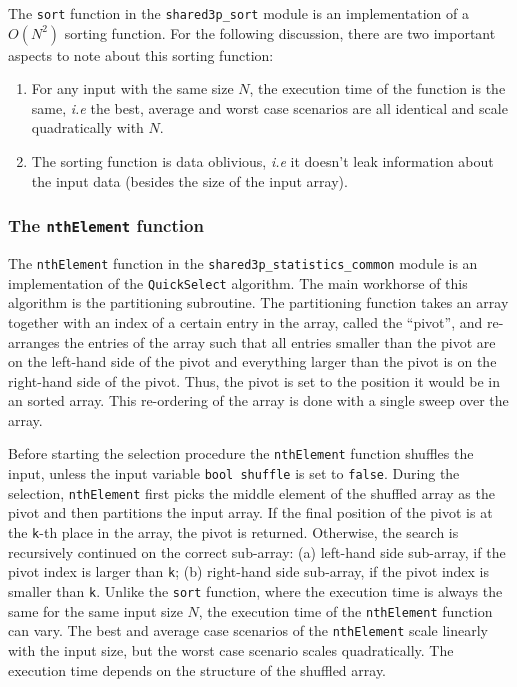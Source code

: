 \documentclass[11pt]{article}
\newcommand{\ct}[1]{\texttt{#1}}
\begin{document}
The \ct{sort} function in the \ct{shared3p\_sort} module is an implementation of a $O(N^2)$ sorting function. For the following discussion, there are two important aspects to note about this sorting function: 

\begin{enumerate}
	\item For any input with the same size $N$, the execution time of the function is the same, \emph{i.e} the best, average and worst case scenarios are all identical and scale quadratically with $N$.

	\item The sorting function is data oblivious, \emph{i.e} it doesn't leak information about the input data (besides the size of the input array).
\end{enumerate}


\subsubsection{The \ct{nthElement} function} %
\label{ssub:the_nthelement_function}

The \ct{nthElement} function in the \ct{shared3p\_statistics\_common} module is an implementation of the \ct{QuickSelect} algorithm. The main workhorse of this algorithm is the partitioning subroutine. The partitioning function takes an array together with an index of a certain entry in the array, called the ``pivot'', and re-arranges the entries of the array such that all entries smaller than the pivot are on the left-hand side of the pivot and everything larger than the pivot is on the right-hand side of the pivot. Thus, the pivot is set to the position it would be in an sorted array. This re-ordering of the array is done with a single sweep over the array. 

Before starting the selection procedure the \ct{nthElement} function shuffles the input, unless the input variable \ct{bool shuffle} is set to \ct{false}. During the selection, \ct{nthElement} first picks the middle element of the shuffled array as the pivot and then partitions the input array. If the final position of the pivot is at the \ct{k}-th place in the array, the pivot is returned. Otherwise, the search is recursively continued on the correct sub-array: (a) left-hand side sub-array, if the pivot index is larger than \ct{k}; (b) right-hand side sub-array, if the pivot index is smaller than \ct{k}. Unlike the \ct{sort} function, where the execution time is always the same for the same input size $N$, the execution time of the \ct{nthElement} function can vary. The best and average case scenarios of the \ct{nthElement} scale linearly with the input size, but the worst case scenario scales quadratically. The execution time depends on the structure of the shuffled array. 
\end{document}
